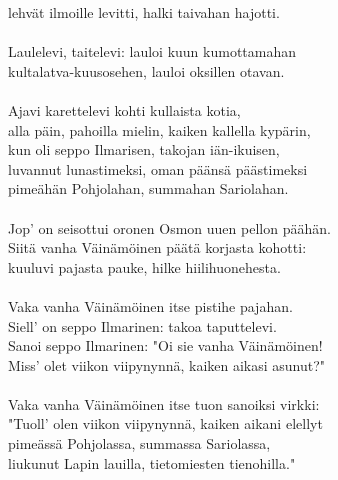 lehvät ilmoille levitti, halki taivahan hajotti.                  \\
                                                                  \\
Laulelevi, taitelevi: lauloi kuun kumottamahan                    \\
kultalatva-kuusosehen, lauloi oksillen otavan.                    \\
                                                                  \\
Ajavi karettelevi kohti kullaista kotia,                          \\
alla päin, pahoilla mielin, kaiken kallella kypärin,              \\
kun oli seppo Ilmarisen, takojan iän-ikuisen,                     \\
luvannut lunastimeksi, oman päänsä päästimeksi                    \\
pimeähän Pohjolahan, summahan Sariolahan.                         \\
                                                                  \\
Jop' on seisottui oronen Osmon uuen pellon päähän.                \\
Siitä vanha Väinämöinen päätä korjasta kohotti:                   \\
kuuluvi pajasta pauke, hilke hiilihuonehesta.                     \\
                                                                  \\
Vaka vanha Väinämöinen itse pistihe pajahan.                      \\
Siell' on seppo Ilmarinen: takoa taputtelevi.                     \\
Sanoi seppo Ilmarinen: "Oi sie vanha Väinämöinen!                 \\
Miss' olet viikon viipynynnä, kaiken aikasi asunut?"              \\
                                                                  \\
Vaka vanha Väinämöinen itse tuon sanoiksi virkki:                 \\
"Tuoll' olen viikon viipynynnä, kaiken aikani elellyt             \\
pimeässä Pohjolassa, summassa Sariolassa,                         \\
liukunut Lapin lauilla, tietomiesten tienohilla."                 \\
